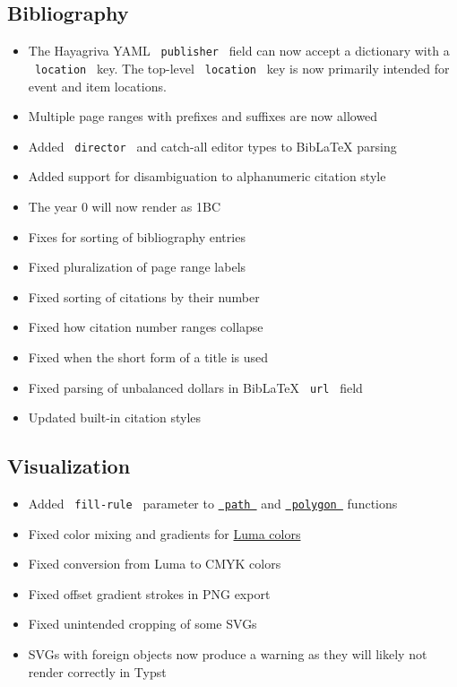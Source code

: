 \subsection{Bibliography}\label{bibliography}

\begin{itemize}
\tightlist
\item
  The Hayagriva YAML \texttt{\ publisher\ } field can now accept a
  dictionary with a \texttt{\ location\ } key. The top-level
  \texttt{\ location\ } key is now primarily intended for event and item
  locations.
\item
  Multiple page ranges with prefixes and suffixes are now allowed
\item
  Added \texttt{\ director\ } and catch-all editor types to BibLaTeX
  parsing
\item
  Added support for disambiguation to alphanumeric citation style
\item
  The year 0 will now render as 1BC
\item
  Fixes for sorting of bibliography entries
\item
  Fixed pluralization of page range labels
\item
  Fixed sorting of citations by their number
\item
  Fixed how citation number ranges collapse
\item
  Fixed when the short form of a title is used
\item
  Fixed parsing of unbalanced dollars in BibLaTeX \texttt{\ url\ } field
\item
  Updated built-in citation styles
\end{itemize}

\subsection{Visualization}\label{visualization}

\begin{itemize}
\tightlist
\item
  Added \texttt{\ fill-rule\ } parameter to
  \href{/docs/reference/visualize/path/\#parameters-fill-rule}{\texttt{\ path\ }}
  and
  \href{/docs/reference/visualize/polygon/\#parameters-fill-rule}{\texttt{\ polygon\ }}
  functions
\item
  Fixed color mixing and gradients for
  \href{/docs/reference/visualize/color/\#definitions-luma}{Luma colors}
\item
  Fixed conversion from Luma to CMYK colors
\item
  Fixed offset gradient strokes in PNG export
\item
  Fixed unintended cropping of some SVGs
\item
  SVGs with foreign objects now produce a warning as they will likely
  not render correctly in Typst
\end{itemize}

